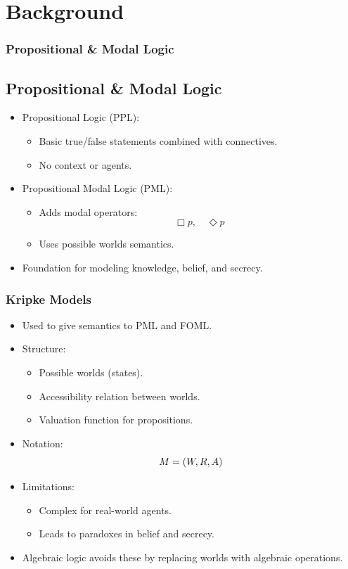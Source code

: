 \documentclass[aspectratio=169]{beamer}
\let\mathcal\relax
\begin{document}

\section{Background}
\begin{frame}
\frametitle{Propositional \& Modal Logic}
\subsection{Propositional \& Modal Logic}
\begin{itemize}
    \item Propositional Logic (PPL):
    \begin{itemize}
        \item Basic true/false statements combined with connectives.
        \item No context or agents.
    \end{itemize}
    \item Propositional Modal Logic (PML):
    \begin{itemize}
        \item Adds modal operators:
        \[
        \Box p, \quad \Diamond p
        \]
        \item Uses possible worlds semantics.
    \end{itemize}
    \item Foundation for modeling knowledge, belief, and secrecy.
\end{itemize}
\end{frame}

\begin{frame}
\frametitle{Kripke Models}
\begin{itemize}
    \item Used to give semantics to PML and FOML.
    \item Structure:
    \begin{itemize}
        \item Possible worlds (states).
        \item Accessibility relation between worlds.
        \item Valuation function for propositions.
    \end{itemize}
    \item Notation:
    \[
    \mathcal{M = (W, R, A)}
    \]
    \item Limitations:
    \begin{itemize}
        \item Complex for real-world agents.
        \item Leads to paradoxes in belief and secrecy.
    \end{itemize}
    \item Algebraic logic avoids these by replacing worlds with algebraic operations.
\end{itemize}
\end{frame}
\end{document}
